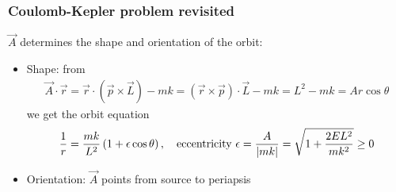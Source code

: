 \documentclass{beamer}
\theoremstyle{definition}
\newcommand{\lp}{\left(}
\newcommand{\rp}{\right)}
\newcommand{\f}[2]{\frac{#1}{#2}}
\begin{document}
\begin{frame}
\frametitle{Coulomb-Kepler problem revisited}
$\vec{A}$ determines the shape and orientation of the orbit: \pause

\begin{itemize}

\item Shape: from
\begin{align*}
\vec{A} \cdot \vec{r} = \vec{r} \cdot (\vec{p} \times \vec{L}) - m k = (\vec{r}\times \vec{p})\cdot \vec{L} - m k = L^2 - m k  =  A r \cos\theta
\end{align*}
\pause
we get the orbit equation
\begin{align*}
\f{1}{r} = \f{m k }{L^2} \lp 1 + \epsilon \cos\theta \rp, \quad  
\text{eccentricity } \epsilon = \f{A}{\abs{ m  k}} = \sqrt{1 + \f{2EL^2}{m k^2}} \geq 0
\end{align*}\pause 

\item Orientation: $\vec{A}$ points from source to periapsis
\end{itemize}

\end{frame}
\end{document}
